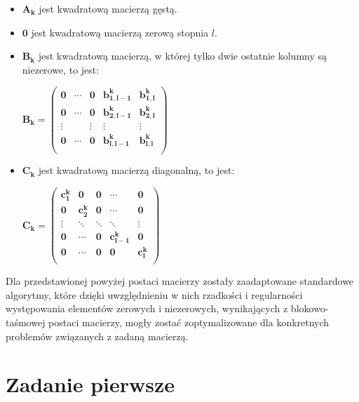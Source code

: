 \documentclass[a4paper]{article}
\begin{document}
\begin{center}
\begin{itemize}
	\item $\mathbf{A_{k}}$ jest kwadratową macierzą gęstą.
	\item $\mathbf{0}$ jest kwadratową macierzą zerową stopnia $l$.
	\item $\mathbf{B_{k}}$ jest kwadratową macierzą, w której tylko dwie ostatnie kolumny są niezerowe, to jest:
	\begin{center}
	$\mathbf{
		B_{k} = 
 		\begin{pmatrix}
 		0 & \cdots & 0 & b^{k}_{1, l - 1} & b^{k}_{1, l} \\
 		0 & \cdots & 0 & b^{k}_{2, l - 1} & b^{k}_{2, l} \\
 		\vdots & & \vdots & \vdots & \vdots \\
 		0 & \cdots & 0 & b^{k}_{l, l - 1} & b^{k}_{l, l} \\
 		\end{pmatrix}
 	}$
	\end{center}
	\item $\mathbf{C_{k}}$ jest kwadratową macierzą diagonalną, to jest:
	\begin{center}
	$\mathbf{
		C_{k} = 
 		\begin{pmatrix}
 		c^{k}_{1} & 0 & 0 & \cdots & 0 \\
 		0 & c^{k}_{2} & 0 & \cdots & 0 \\
 		\vdots & \ddots & \ddots & \ddots & \vdots \\
 		0 & \cdots & 0 & c^{k}_{l - 1} & 0 \\
 		0 & \cdots & 0 & 0 & c^{k}_{l} \\
 		\end{pmatrix}
 	}$
	\end{center}
\end{itemize}
\end{center}



Dla przedstawionej powyżej postaci macierzy zostały zaadaptowane standardowe algorytmy, które dzięki uwzględnieniu w nich rzadkości i regularności występowania elementów zerowych i niezerowych, wynikających z blokowo-taśmowej postaci macierzy, mogły zostać zoptymalizowane dla konkretnych problemów związanych z zadaną macierzą.

\section{Zadanie pierwsze}
\end{document}
